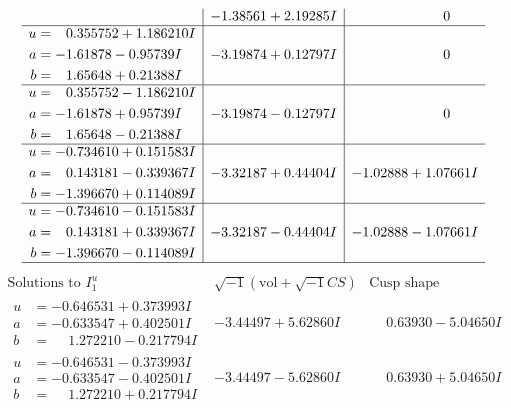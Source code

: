 \documentclass[1p]{elsarticle_modified}
\theoremstyle{definition}
\newcommand{\I}{\sqrt{-1}}
\begin{document}
$$\begin{array}{c|c|c}
 & -1.38561 + 2.19285 I & \phantom{-0.000000 } 0 \\ \hline\begin{aligned}
u &= \phantom{-}0.355752 + 1.186210 I \\
a &= -1.61878 - 0.95739 I \\
b &= \phantom{-}1.65648 + 0.21388 I\end{aligned}
 & -3.19874 + 0.12797 I & \phantom{-0.000000 } 0 \\ \hline\begin{aligned}
u &= \phantom{-}0.355752 - 1.186210 I \\
a &= -1.61878 + 0.95739 I \\
b &= \phantom{-}1.65648 - 0.21388 I\end{aligned}
 & -3.19874 - 0.12797 I & \phantom{-0.000000 } 0 \\ \hline\begin{aligned}
u &= -0.734610 + 0.151583 I \\
a &= \phantom{-}0.143181 - 0.339367 I \\
b &= -1.396670 + 0.114089 I\end{aligned}
 & -3.32187 + 0.44404 I & -1.02888 + 1.07661 I \\ \hline\begin{aligned}
u &= -0.734610 - 0.151583 I \\
a &= \phantom{-}0.143181 + 0.339367 I \\
b &= -1.396670 - 0.114089 I\end{aligned}
 & -3.32187 - 0.44404 I & -1.02888 - 1.07661 I\\
 \hline 
 \end{array}$$\newpage$$\begin{array}{c|c|c}  
\text{Solutions to }I^u_{1}& \I (\text{vol} + \sqrt{-1}CS) & \text{Cusp shape}\\
 \hline 
\begin{aligned}
u &= -0.646531 + 0.373993 I \\
a &= -0.633547 + 0.402501 I \\
b &= \phantom{-}1.272210 - 0.217794 I\end{aligned}
 & -3.44497 + 5.62860 I & \phantom{-}0.63930 - 5.04650 I \\ \hline\begin{aligned}
u &= -0.646531 - 0.373993 I \\
a &= -0.633547 - 0.402501 I \\
b &= \phantom{-}1.272210 + 0.217794 I\end{aligned}
 & -3.44497 - 5.62860 I & \phantom{-}0.63930 + 5.04650 I \\ \hline\begin{aligned}

\end{aligned}
\end{array}$$
\end{document}
